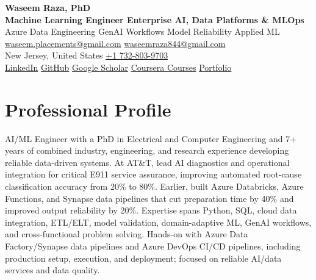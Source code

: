 \documentclass[9pt,letterpaper]{extarticle}
\begin{document}
\begin{center}
{\LARGE\bfseries Waseem Raza, PhD}{\normalsize\mdseries }\\[2pt]
{\large\bfseries Machine Learning Engineer \textbar{} Enterprise AI, Data Platforms \& MLOps}\\[1pt]
{\small Azure Data Engineering \textbar{} GenAI Workflows \textbar{} Model Reliability \textbar{} Applied ML}\\[3pt]
{\footnotesize {}\enspace \href{mailto:waseem.placements@gmail.com}{waseem.placements@gmail.com} \textbar{} \href{mailto:waseemraza844@gmail.com}{waseemraza844@gmail.com}\\[1pt]New Jersey, United States \quad {}\enspace \href{tel:+17328039703}{+1 732-803-9703}\\[1pt]\href{https://www.linkedin.com/in/waseem-raza-phd-9a737858/}{LinkedIn} \textbar{} \href{https://github.com/WaseemRaza844}{GitHub} \textbar{} \href{https://scholar.google.com/citations?user=d58Drr0AAAAJ\&hl=en}{Google Scholar} \textbar{} \href{https://waseemraza844.github.io/portfolio/learning.html}{Coursera Courses} \textbar{} \href{https://waseemraza844.github.io/portfolio/}{Portfolio}}
\end{center}
\vspace{-5pt}
\section{Professional Profile}
AI/ML Engineer with a PhD in Electrical and Computer Engineering and 7+ years of combined industry, engineering, and research experience developing reliable data-driven systems. At AT\&T, lead AI diagnostics and operational integration for critical E911 service assurance, improving automated root-cause classification accuracy from 20\% to 80\%. Earlier, built Azure Databricks, Azure Functions, and Synapse data pipelines that cut preparation time by 40\% and improved output reliability by 20\%. Expertise spans Python, SQL, cloud data integration, ETL/ELT, model validation, domain-adaptive ML, GenAI workflows, and cross-functional problem solving. Hands-on with Azure Data Factory/Synapse data pipelines and Azure DevOps CI/CD pipelines, including production setup, execution, and deployment; focused on reliable AI/data services and data quality.
\end{document}
